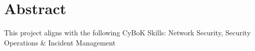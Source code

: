 
\section*{Abstract}
\vspace{2cm}





	\begin{center}
		{\small This project aligns with the following CyBoK Skills: Network Security, Security Operations \& Incident Management }
		\vspace{10mm}
	\end{center}